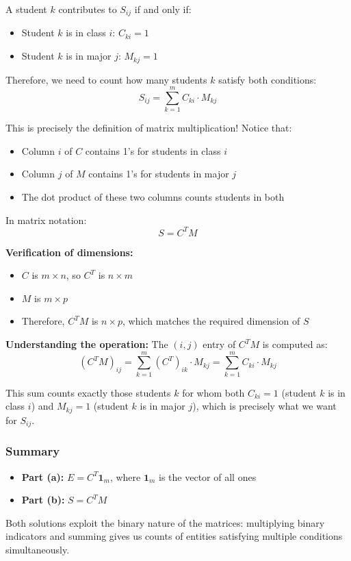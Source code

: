 \documentclass[11pt]{article}
\begin{document}
A student $k$ contributes to $S_{ij}$ if and only if:
\begin{itemize}
    \item Student $k$ is in class $i$: $C_{ki} = 1$
    \item Student $k$ is in major $j$: $M_{kj} = 1$
\end{itemize}

Therefore, we need to count how many students $k$ satisfy both conditions:
\[
S_{ij} = \sum_{k=1}^{m} C_{ki} \cdot M_{kj}
\]

This is precisely the definition of matrix multiplication! Notice that:
\begin{itemize}
    \item Column $i$ of $C$ contains 1's for students in class $i$
    \item Column $j$ of $M$ contains 1's for students in major $j$
    \item The dot product of these two columns counts students in both
\end{itemize}

In matrix notation:
\[
S = C^T M
\]

\textbf{Verification of dimensions:}
\begin{itemize}
    \item $C$ is $m \times n$, so $C^T$ is $n \times m$
    \item $M$ is $m \times p$
    \item Therefore, $C^T M$ is $n \times p$, which matches the required dimension of $S$
\end{itemize}

\textbf{Understanding the operation:} The $(i,j)$ entry of $C^T M$ is computed as:
\[
(C^T M)_{ij} = \sum_{k=1}^{m} (C^T)_{ik} \cdot M_{kj} = \sum_{k=1}^{m} C_{ki} \cdot M_{kj}
\]

This sum counts exactly those students $k$ for whom both $C_{ki} = 1$ (student $k$ is in class $i$) and $M_{kj} = 1$ (student $k$ is in major $j$), which is precisely what we want for $S_{ij}$.

\subsubsection{Summary}

\begin{itemize}
    \item \textbf{Part (a):} $E = C^T \mathbf{1}_m$, where $\mathbf{1}_m$ is the vector of all ones
    \item \textbf{Part (b):} $S = C^T M$
\end{itemize}

Both solutions exploit the binary nature of the matrices: multiplying binary indicators and summing gives us counts of entities satisfying multiple conditions simultaneously.
\end{document}
